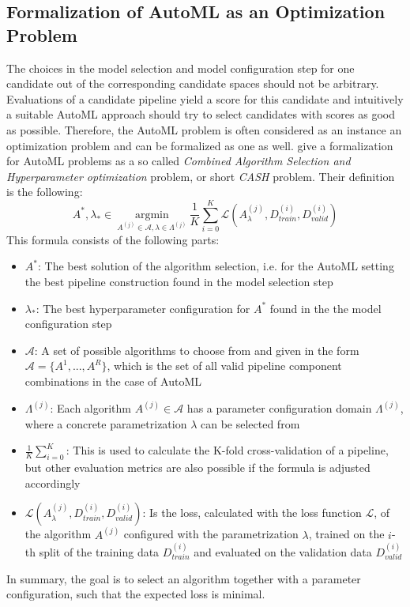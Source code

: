 \subsection{Formalization of AutoML as an Optimization Problem}
\label{sec:theory:automl:optimization}
The choices in the model selection and model configuration step for one candidate out of the corresponding candidate spaces should not be arbitrary.
Evaluations of a candidate pipeline yield a score for this candidate and intuitively a suitable AutoML approach should try to select candidates with scores as good as possible.
Therefore, the AutoML problem is often considered as an instance an optimization problem and can be formalized as one as well.\newline
\textcite{Feurer-Cash} give a formalization for AutoML problems as a so called \textit{Combined Algorithm Selection and Hyperparameter optimization} problem, or short \textit{CASH} problem.
Their definition is the following:
\begin{equation*}
    A^*, \lambda_* \in \> \underset{A^{(j)} \in \mathcal{A},\lambda \in \Lambda^{(j)}}{\mathrm{argmin}} \> \frac{1}{K} \sum_{i=0}^K \mathcal{L} (A_\lambda^{(j)}, D_{\textit{train}}^{(i)}, D_{\textit{valid}}^{(i)})
\end{equation*}
This formula consists of the following parts:
\begin{itemize}
    \item $A^*$: The best solution of the algorithm selection, i.e. for the AutoML setting the best pipeline construction found in the model selection step
    \item $\lambda_*$: The best hyperparameter configuration for $A^*$ found in the the model configuration step
    \item $\mathcal{A}$: A set of possible algorithms to choose from and given in the form $\mathcal{A} = \{A^{1}, ..., A^{R} \}$, which is the set of all valid pipeline component combinations in the case of AutoML
    \item $\Lambda^{(j)}$: Each algorithm $A^{(j)} \in \mathcal{A}$ has a parameter configuration domain $\Lambda^{(j)}$, where a concrete parametrization $\lambda$ can be selected from
    \item $\frac{1}{K} \sum_{i=0}^K $: This is used to calculate the K-fold cross-validation of a pipeline, but other evaluation metrics are also possible if the formula is adjusted accordingly
    \item $\mathcal{L} (A_\lambda^{(j)}, D_{\textit{train}}^{(i)}, D_{\textit{valid}}^{(i)})$: Is the loss, calculated with the loss function $\mathcal{L}$, of the algorithm $A^{(j)}$ configured with the parametrization $\lambda$, trained on the $i$-th split of the training data $D_{\textit{train}}^{(i)}$ and evaluated on the validation data $D_{\textit{valid}}^{(i)}$
\end{itemize}
In summary, the goal is to select an algorithm together with a parameter configuration, such that the expected loss is minimal.

